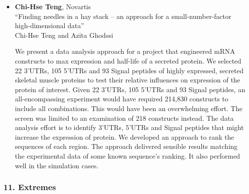 \begin{itemize}
\item \textbf{Chi-Hse Teng}, Novartis \\
``Finding needles in a hay stack – an approach for a small-number-factor high-dimensional data'' \\
Chi-Hse Teng and Azita Ghodssi


We present a data analysis approach for a project that engineered mRNA constructs to max expression and half-life of a secreted protein.  We selected 22 3’UTRs, 105 5’UTRs and 93 Signal peptides of highly expressed, secreted skeletal muscle proteins to test their relative influences on expression of the protein of interest.  Given 22 3’UTRs, 105 5’UTRs and 93 Signal peptides, an all-encompassing experiment would have required 214,830 constructs to include all combinations. This would have been an overwhelming effort. The screen was limited to an examination of 218 constructs instead.  The data analysis effort is to identify 3’UTRs, 5’UTRs and Signal peptides that might increase the expression of protein.   We developed an approach to rank the sequences of each region.  The approach delivered sensible results matching the experimental data of some known sequence’s ranking.   It also performed well in the simulation cases.

\end{itemize}

\subsubsection*{11. Extremes}

